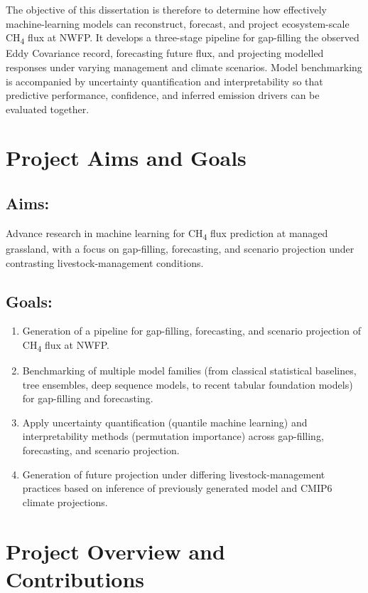 The objective of this dissertation is therefore to determine how effectively
machine-learning models can reconstruct, forecast, and project ecosystem-scale
CH\textsubscript{4} flux at NWFP. It develops a three-stage
pipeline for gap-filling the observed Eddy Covariance record, forecasting future
flux, and projecting modelled responses under varying management and
climate scenarios. Model benchmarking is accompanied by uncertainty
quantification and interpretability so that predictive performance, confidence,
and inferred emission drivers can be evaluated together.

\section{Project Aims and Goals}

\subsection*{Aims:}
Advance research in machine learning for CH\textsubscript{4} flux prediction at 
managed grassland, with a focus on gap-filling, forecasting, and scenario projection
under contrasting livestock-management conditions.

\subsection*{Goals:}
\begin{enumerate}
    \item Generation of a pipeline for gap-filling, forecasting, and scenario projection of CH\textsubscript{4} flux at NWFP.
    \item Benchmarking of multiple model families (from classical statistical baselines, tree ensembles, 
    deep sequence models, to recent tabular foundation models) for gap-filling and forecasting.
    \item Apply uncertainty quantification (quantile machine learning) and interpretability 
    methods (permutation importance) across gap-filling, forecasting, and scenario projection.
    \item Generation of future projection under differing livestock-management practices based on 
    inference of previously generated model and CMIP6 climate projections.
\end{enumerate}

\section{Project Overview and Contributions}

